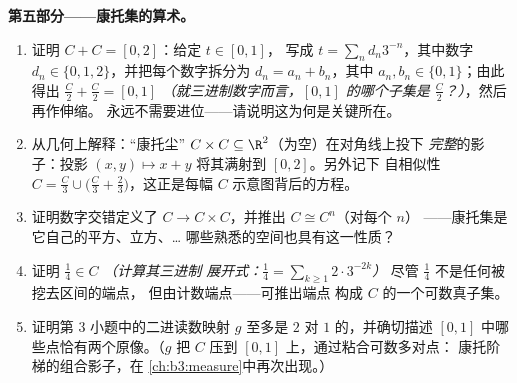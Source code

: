\begin{problem}
\medskip
\noindent\textbf{第五部分——康托集的算术。}
\begin{enumerate}[resume]
  \item 证明 $C + C = [0, 2]$：给定 $t \in [0, 1]$，
        写成 $t = \sum_n d_n3^{-n}$，其中数字 $d_n \in \{0,
        1, 2\}$，并把每个数字拆分为 $d_n = a_n + b_n$，其中
        $a_n, b_n \in \{0, 1\}$；由此得出 $\frac C2 +
        \frac C2 = [0, 1]$ \emph{（就三进制数字而言，$[0,1]$ 的哪个子集是
        $\frac C2$？）}，然后再作伸缩。
        永远不需要进位——请说明这为何是关键所在。
  \item 从几何上解释：“康托尘” $C \times
        C \subseteq \R^2$（为空）在对角线上投下
        \emph{完整}的影子：投影 $(x,
        y) \mapsto x + y$ 将其满射到 $[0, 2]$。另外记下
        自相似性 $C = \frac C3 \cup \bigl(\frac C3 +
        \frac23\bigr)$，这正是每幅
        $C$ 示意图背后的方程。
  \item 证明数字交错定义了 $C
        \to C \times C$，并推出 $C \cong C^n$（对每个 $n$）
——康托集是它自己的平方、立方、\dots{}
        哪些熟悉的空间也具有这一性质？
  \item 证明 $\frac14 \in C$ \emph{（计算其三进制
        展开式：$\frac14 = \sum_{k\geq1} 2\cdot3^{-2k}$）}
        尽管 $\frac14$ 不是任何被挖去区间的端点，
        但由计数端点——可推出端点
        构成 $C$ 的一个可数真子集。
  \item 证明第 3 小题中的二进读数映射 $g$ 至多是
        $2$ 对 $1$ 的，并确切描述
        $[0,1]$ 中哪些点恰有两个原像。（$g$ 把 $C$ 压到
        $[0,1]$ 上，通过粘合可数多对点：
        康托阶梯的组合影子，在
        \cref{ch:b3:measure}中再次出现。）
\end{enumerate}


\end{problem}
